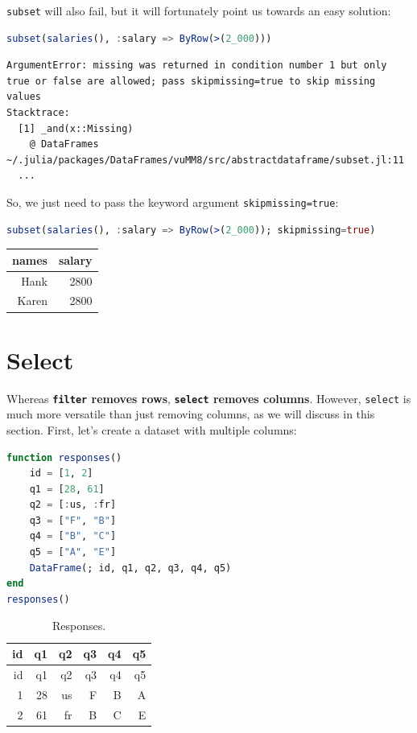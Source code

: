 \documentclass[
  notoc %
]{tufte-book}
\newcommand{\passthrough}[1]{#1}
\begin{document}
\passthrough{\lstinline!subset!} will also fail, but it will fortunately
point us towards an easy solution:

\begin{lstlisting}[language=Julia]
subset(salaries(), :salary => ByRow(>(2_000)))
\end{lstlisting}

\begin{lstlisting}[language=Output]
ArgumentError: missing was returned in condition number 1 but only true or false are allowed; pass skipmissing=true to skip missing values
Stacktrace:
  [1] _and(x::Missing)
    @ DataFrames ~/.julia/packages/DataFrames/vuMM8/src/abstractdataframe/subset.jl:11
  ...
\end{lstlisting}

So, we just need to pass the keyword argument
\passthrough{\lstinline!skipmissing=true!}:

\begin{lstlisting}[language=Julia]
subset(salaries(), :salary => ByRow(>(2_000)); skipmissing=true)
\end{lstlisting}

\begin{longtable}[]{@{}rr@{}}
\toprule
names & salary \\
\midrule
\endhead
Hank & 2800 \\
Karen & 2800 \\
\bottomrule
\end{longtable}

\hypertarget{sec:select}{%
\section{Select}\label{sec:select}}

Whereas \textbf{\passthrough{\lstinline!filter!} removes rows},
\textbf{\passthrough{\lstinline!select!} removes columns}. However,
\passthrough{\lstinline!select!} is much more versatile than just
removing columns, as we will discuss in this section. First, let's
create a dataset with multiple columns:

\begin{lstlisting}[language=Julia]
function responses()
    id = [1, 2]
    q1 = [28, 61]
    q2 = [:us, :fr]
    q3 = ["F", "B"]
    q4 = ["B", "C"]
    q5 = ["A", "E"]
    DataFrame(; id, q1, q2, q3, q4, q5)
end
responses()
\end{lstlisting}

\hypertarget{tbl:responses}{}
\begin{longtable}[]{@{}rrrrrr@{}}
\caption{\label{tbl:responses}Responses.}\tabularnewline
\toprule
id & q1 & q2 & q3 & q4 & q5 \\
\midrule
\endfirsthead
\toprule
id & q1 & q2 & q3 & q4 & q5 \\
\midrule
\endhead
1 & 28 & us & F & B & A \\
2 & 61 & fr & B & C & E \\
\bottomrule
\end{longtable}
\end{document}
